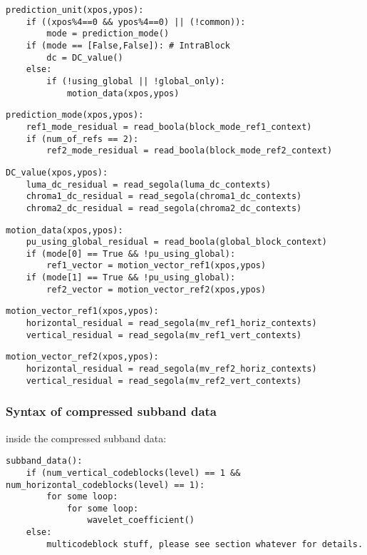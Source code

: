 {\begin{verbatim}
prediction_unit(xpos,ypos):
    if ((xpos%4==0 && ypos%4==0) || (!common)):
        mode = prediction_mode()
    if (mode == [False,False]): # IntraBlock
        dc = DC_value()
    else:
        if (!using_global || !global_only):
            motion_data(xpos,ypos)
\end{verbatim}

\begin{verbatim}
prediction_mode(xpos,ypos):
    ref1_mode_residual = read_boola(block_mode_ref1_context)
    if (num_of_refs == 2):
        ref2_mode_residual = read_boola(block_mode_ref2_context)
\end{verbatim}

\begin{verbatim}
DC_value(xpos,ypos):
    luma_dc_residual = read_segola(luma_dc_contexts)
    chroma1_dc_residual = read_segola(chroma1_dc_contexts)
    chroma2_dc_residual = read_segola(chroma2_dc_contexts)
\end{verbatim}

\begin{verbatim}
motion_data(xpos,ypos):
    pu_using_global_residual = read_boola(global_block_context)
    if (mode[0] == True && !pu_using_global):
        ref1_vector = motion_vector_ref1(xpos,ypos)
    if (mode[1] == True && !pu_using_global):
        ref2_vector = motion_vector_ref2(xpos,ypos)
\end{verbatim}

\begin{verbatim}
motion_vector_ref1(xpos,ypos):
    horizontal_residual = read_segola(mv_ref1_horiz_contexts)
    vertical_residual = read_segola(mv_ref1_vert_contexts)
\end{verbatim}

\begin{verbatim}
motion_vector_ref2(xpos,ypos):
    horizontal_residual = read_segola(mv_ref2_horiz_contexts)
    vertical_residual = read_segola(mv_ref2_vert_contexts)
\end{verbatim}


\subsubsection{Syntax of compressed subband data}
inside the compressed subband data:

\begin{verbatim}
subband_data():
    if (num_vertical_codeblocks(level) == 1 && num_horizontal_codeblocks(level) == 1):
        for some loop:
            for some loop:
                wavelet_coefficient()
    else:
        multicodeblock stuff, please see section whatever for details.
\end{verbatim}

}
